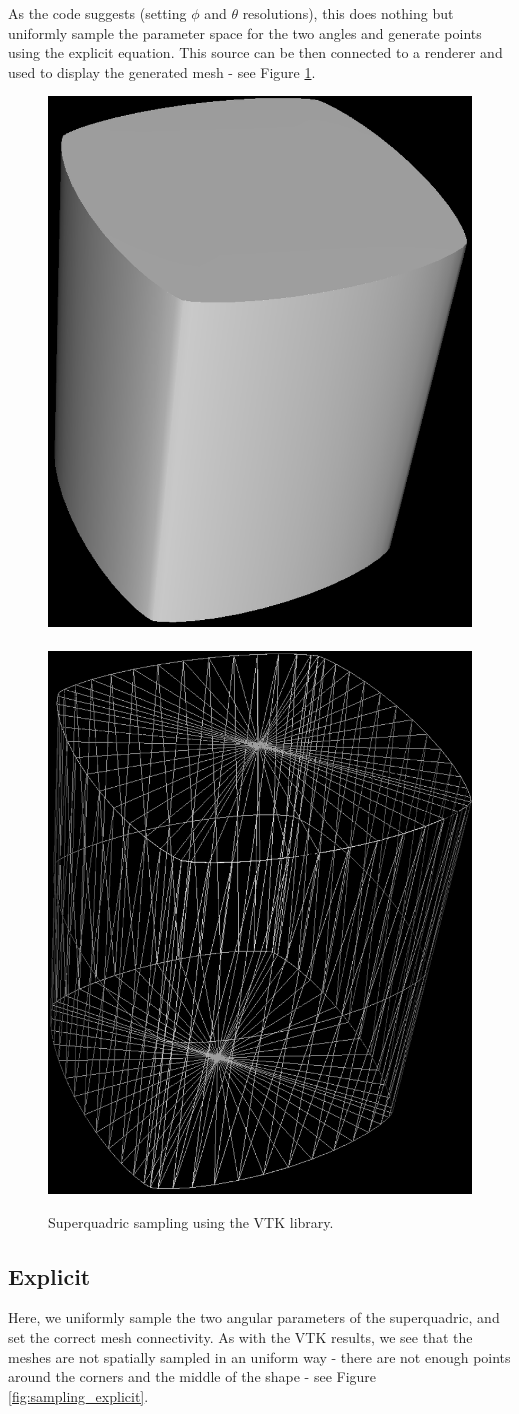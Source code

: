 \documentclass{article}
\begin{document}
As the code suggests (setting $\phi$ and $\theta$ resolutions), this does nothing but uniformly sample the parameter space for the two angles and generate points using the explicit equation. This source can be then connected to a renderer and used to display the generated mesh - see Figure \ref{fig:sampling_VTK}.

\begin{figure}
\centering
\includegraphics[width=0.25\columnwidth]{figures/sampling_VTK_solid}
\hspace {1cm}
\includegraphics[width=0.25\columnwidth]{figures/sampling_VTK_wireframe}
\caption {Superquadric sampling using the VTK library.}
\label{fig:sampling_VTK}
\end{figure}


\subsection {Explicit}

Here, we uniformly sample the two angular parameters of the superquadric, and set the correct mesh connectivity. As with the VTK results, we see that the meshes are not spatially sampled in an uniform way - there are not enough points around the corners and the middle of the shape - see Figure \ref{fig:sampling_explicit}.
\end{document}
